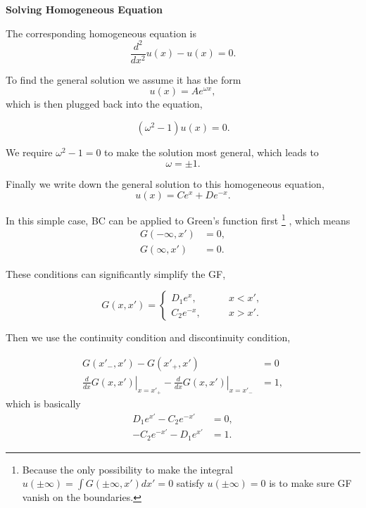 \documentclass{tufte-handout}
\begin{document}
\begin{framed}
{\bf Solving Homogeneous Equation}

The corresponding homogeneous equation is
\begin{equation*}
    \frac{d^2}{dx^2} u(x) - u(x) = 0.
\end{equation*}

To find the general solution we assume it has the form
\begin{equation*}
    u(x) = A e^{\omega x},
\end{equation*}
which is then plugged back into the equation,

\begin{equation*}
    (\omega^2 - 1) u(x) = 0.
\end{equation*}

We require $\omega^2-1=0$ to make the solution most general, which leads to
\begin{equation*}
    \omega = \pm 1.
\end{equation*}

Finally we write down the general solution to this homogeneous equation,
\begin{equation*}
    u(x) = C e^{x} + D e^{-x}.
\end{equation*}

\end{framed}

In this simple case, BC can be applied to Green's function first
\footnote{Because the only possibility to make the integral $u(\pm\infty)=\int G(\pm\infty,x') dx'=0$ satisfy $u(\pm\infty)=0$ is to make sure GF vanish on the boundaries.}
, which means
\begin{align*}
    G(-\infty,x') &= 0, \\
    G(\infty,x') &= 0.
\end{align*}

These conditions can significantly simplify the GF,

\begin{equation*}
    G(x,x') = \begin{cases}
    D_1 e^{x}, & \qquad x<x',\\
    C_2 e^{-x}, & \qquad x>x'.
    \end{cases}
\end{equation*}

Then we use the continuity condition and discontinuity condition,

\begin{align*}
    G(x'_-,x') - G(x'_+,x') &= 0\\
    \left.\frac{d}{dx}G(x,x')\right\vert_{x=x'_+} - \left.\frac{d}{dx}G(x,x')\right\vert_{x=x'_-} &= 1,
\end{align*}
which is basically
\begin{align*}
    D_1 e^{x'} - C_2 e^{-x'} &= 0,\\
    - C_2 e^{-x'} - D_1 e^{x'} & =1.
\end{align*}
\end{document}
